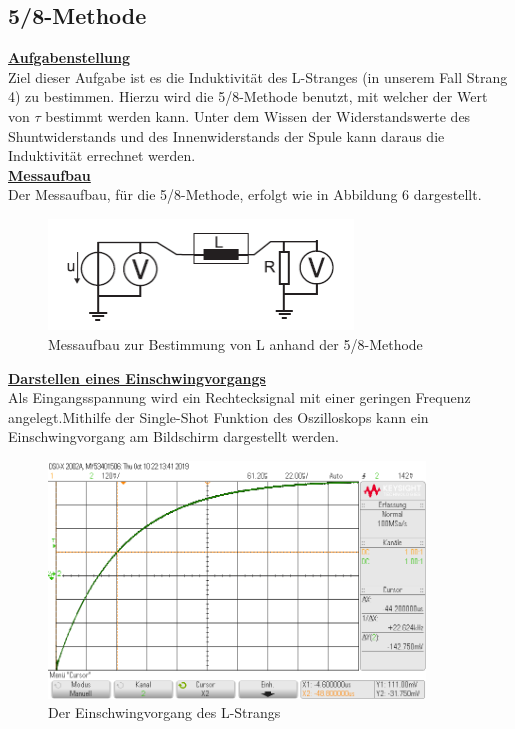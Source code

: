 \documentclass[a4paper,12pt]{article}
\begin{document}
	\subsection{5/8-Methode}
	\underline{\textbf{Aufgabenstellung}} \\ \newline
	\noindent
	Ziel dieser Aufgabe ist es die Induktivität des L-Stranges (in unserem Fall Strang 4) zu bestimmen. Hierzu wird die 5/8-Methode benutzt, mit welcher der Wert von $\tau$ bestimmt werden kann. Unter dem Wissen der Widerstandswerte des Shuntwiderstands und des Innenwiderstands der Spule kann daraus die Induktivität errechnet werden.\\ \newline
	\noindent
	\underline{\textbf{Messaufbau}}\\ \newline
	Der Messaufbau, für die 5/8-Methode, erfolgt wie in Abbildung 6 dargestellt.
	\begin{figure}[h]
		\centering
		\includegraphics[width=8.1cm]{assets/58methode}
		\caption{Messaufbau zur Bestimmung von L anhand der 5/8-Methode}
	\end{figure}\newline
	\noindent
	\underline{\textbf{Darstellen eines Einschwingvorgangs}}\\ \newline
	Als Eingangsspannung wird ein Rechtecksignal mit einer geringen Frequenz angelegt.\newline Mithilfe der Single-Shot Funktion des Oszilloskops kann ein Einschwingvorgang am Bildschirm dargestellt werden.
	\begin{figure}[h]
		\centering
		\includegraphics[width=10cm]{assets/58methode_oszi}
		\caption{Der Einschwingvorgang des L-Strangs}
	\end{figure}\newline
\end{document}
